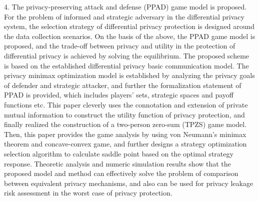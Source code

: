 \begin{englishabstract}
4. The privacy-preserving attack and defense (PPAD) game model is proposed. For the problem of informed and strategic adversary in the differential privacy system, the selection strategy of differential privacy protection is designed around the data collection scenarios. On the basis of the above, the PPAD game model is proposed, and the trade-off between privacy and utility in the protection of differential privacy is achieved by solving the equilibrium. The proposed scheme is based on the established differential privacy basic communication model. The privacy minimax optimization model is established by analyzing the privacy goals of defender and strategic attacker, and further the formalization statement of PPAD is provided, which includes players' sets, strategic spaces and payoff functions etc. This paper cleverly uses the connotation and extension of private mutual information to construct the utility function of privacy protection, and finally realized the construction of a two-person zero-sum (TPZS) game model. Then, this paper provides the game analysis by using von Neumann's minimax theorem and concave-convex game, and further designs a strategy optimization selection algorithm to calculate saddle point based on the optimal strategy response. Theoretic analysis and numeric simulation results show that the proposed model and method can effectively solve the problem of comparison between equivalent privacy mechanisms, and also can be used for privacy leakage risk assessment in the worst case of privacy protection.







\end{englishabstract}
